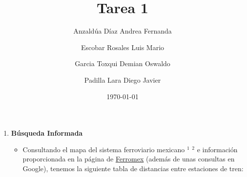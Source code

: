 \documentclass{article}
\title{Tarea 1}
\author{ 
  \small Anzaldúa Díaz Andrea Fernanda \and
  \small Escobar Rosales Luis Mario \and
  \small Garcia Toxqui Demian Oswaldo \and
  \small Padilla Lara Diego Javier
}
\date{\today}
\begin{document}
\maketitle \thispagestyle{firstpage}

\begin{enumerate}[\textbf{4.}]
  \item \textbf{Búsqueda Informada}
  \begin{itemize}[1.]
    \item Consultando el mapa del sistema ferroviario mexicano 
    \href{https://www.ferromex.com.mx/ferromex-lo-mueve/sistema-ferromex.jsp}{$^{1}$} 
    \href{https://www.gob.mx/cms/uploads/attachment/file/559748/SFM_2020_ESQUEMATICO_.pdf}{$^{2}$} 
    e información proporcionada en la página de \href{https://www.ferromex.com.mx/herramientas/tabla-de-distancias.jsp?eorigen=FXE_09699&edestino=FXE_00929&distancia=1799.9}{Ferromex} (además de unas consultas en Google), 
     tenemos la siguiente tabla de distancias entre estaciones de tren:


\end{itemize}
\end{enumerate}
\end{document}
